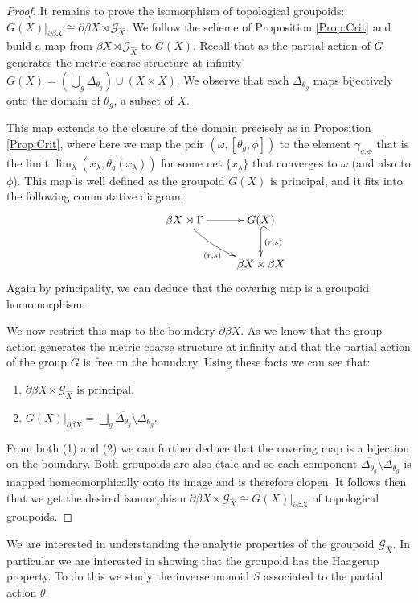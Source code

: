 \documentclass[11pt]{amsart}
\theoremstyle{plain}
\theoremstyle{definition}%
\theoremstyle{remark}%
\newcommand{\G}{\mathcal{G}}
\begin{document}
\begin{proof}
It remains to prove the isomorphism of topological groupoids: $G(X)|_{\partial\beta X} \cong \partial\beta X \rtimes \G_{\widehat{X}}$. We follow the scheme of Proposition \ref{Prop:Crit} and build a map from $\beta X\rtimes \G_{\widehat{X}}$ to $G(X)$. Recall that as the partial action of $G$ generates the metric coarse structure at infinity $G(X)= (\bigcup_{g} \Delta_{\theta_{g}})\cup (X \times X)$. We observe that each $\Delta_{\theta_{g}}$ maps bijectively onto the domain of $\theta_{g}$, a subset of $X$.

This map extends to the closure of the domain precisely as in Proposition \ref{Prop:Crit}, where here we map the pair $(\omega,[\theta_{g},\phi])$ to the element $\gamma_{g,\phi}$ that is the limit $\lim_{\lambda}(x_{\lambda},\theta_{g}(x_{\lambda}))$ for some net $\lbrace x_{\lambda} \rbrace$ that converges to $\omega$ (and also to $\phi$). This map is well defined as the groupoid $G(X)$ is principal, and it fits into the following commutative diagram:
\begin{equation*}
\xymatrix{
& \beta X \rtimes \Gamma \ar@/_/[rd]_{(r,s)} \ar[r] & G(X) \ar@{^{(}->}[d]^{(r,s)}\\ & & \beta X \times \beta X
}
\end{equation*}
Again by principality, we can deduce that the covering map is a groupoid homomorphism.

We now restrict this map to the boundary $\partial\beta X$. As we know that the group action generates the metric coarse structure at infinity and that the partial action of the group $G$ is free on the boundary. Using these facts we can see that:
\begin{enumerate}
\item $\partial\beta X \rtimes \G_{\widehat{X}}$ is principal.
\item $G(X)|_{\partial\beta X} = \bigsqcup_{g}\overline{\Delta_{\theta_{g}}}\setminus \Delta_{\theta_{g}}$. 
\end{enumerate}
From both (1) and (2) we can further deduce that the covering map is a bijection on the boundary. Both groupoids are also \'etale and so each component $\overline{\Delta_{\theta_{g}}}\setminus \Delta_{\theta_{g}}$ is mapped homeomorphically onto its image and is therefore clopen. It follows then that we get the desired isomorphism $\partial\beta X \rtimes \G_{\widehat{X}} \cong G(X)|_{\partial\beta X}$ of topological groupoids.\end{proof}

We are interested in understanding the analytic properties of the groupoid $\G_{\widehat{X}}$. In particular we are interested in showing that the groupoid has the Haagerup property. To do this we study the inverse monoid $S$ associated to the partial action $\theta$.
\end{document}
